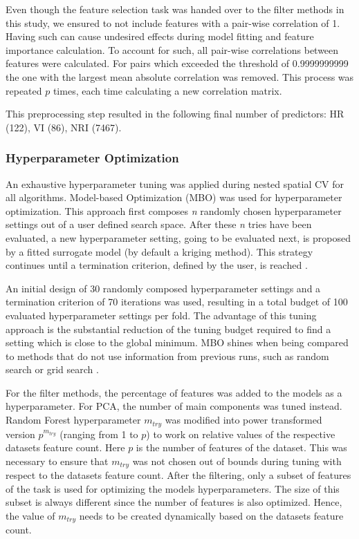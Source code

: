 \documentclass[letterpaper, peerreview]{IEEEtran}
\begin{document}
Even though the feature selection task was handed over to the filter methods in this study, we ensured to not include features with a pair-wise correlation of 1.
Having such can cause undesired effects during model fitting and feature importance calculation.
To account for such, all pair-wise correlations between features were calculated.
For pairs which exceeded the threshold of 0.9999999999 the one with the largest mean absolute correlation was removed.
This process was repeated $p$ times, each time calculating a new correlation matrix.

This preprocessing step resulted in the following final number of predictors: HR (122), VI (86), NRI (7467).

\subsubsection{Hyperparameter Optimization}

\noindent An exhaustive hyperparameter tuning was applied during nested spatial \ac{CV} for all algorithms.
Model-based Optimization \cite{mlrmbo} (MBO) was used for hyperparameter optimization.
This approach first composes \textit{n} randomly chosen hyperparameter settings out of a user defined search space.
After these \textit{n} tries have been evaluated, a new hyperparameter setting, going to be evaluated next, is proposed by a fitted surrogate model (by default a kriging method).
This strategy continues until a termination criterion, defined by the user, is reached \cite{hutter2011, jones1998}.

An initial design of 30 randomly composed hyperparameter settings and a termination criterion of 70 iterations was used, resulting in a total budget of 100 evaluated hyperparameter settings per fold.
The advantage of this tuning approach is the substantial reduction of the tuning budget required to find a setting which is close to the global minimum.
\ac{MBO} shines when being compared to methods that do not use information from previous runs, such as random search or grid search \cite{bergstra2012}.

For the filter methods, the percentage of features was added to the models as a hyperparameter.
For \ac{PCA}, the number of main components was tuned instead.
Random Forest hyperparameter \texttt{\(m_{try}\)} was modified into power transformed version \(p^{m_{try}}\) (ranging from 1 to $p$) to work on relative values of the respective datasets feature count.
Here \(p\) is the number of features of the dataset.
This was necessary to ensure that \texttt{\(m_{try}\)} was not chosen out of bounds during tuning with respect to the datasets feature count.
After the filtering, only a subset of features of the task is used for optimizing the models hyperparameters.
The size of this subset is always different since the number of features is also optimized.
Hence, the value of \texttt{\(m_{try}\)} needs to be created dynamically based on the datasets feature count.
\end{document}
